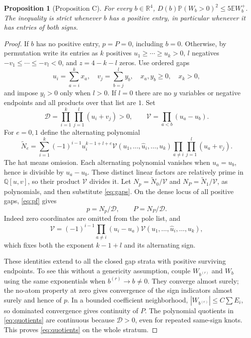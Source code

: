\documentclass[11pt]{article}
\newtheorem{proposition}[theorem]{Proposition}
\theoremstyle{remark}\newtheorem{remark}[theorem]{Remark}
\newcommand{\R}{\mathbb R}
\newcommand{\E}{\mathbb E}
\newcommand{\Prob}{\mathbb P}
\newcommand{\Den}{\mathcal D}
\newcommand{\Vand}{\mathcal V}
\numberwithin{equation}{section}
\begin{document}
\begin{proposition}[Proposition C]\label{prop:C}
For every $b\in\R^4$, $D(b)\Prob(W_b>0)^2\le5\E W_b^+$.
The inequality is strict whenever $b$ has a positive entry, in
particular whenever it has entries of both signs.
\end{proposition}
\begin{proof}
If $b$ has no positive entry, $p=P=0$, including $b=0$.
Otherwise, by permutation write its entries as $k$ positives
$u_1\ge\cdots\ge u_k>0$, $l$ negatives $-v_1\le\cdots\le-v_l<0$,
and $z=4-k-l$ zeros. Use ordered gaps
\begin{equation}\label{eq:gaps}
 u_i=\sum_{a=i}^k x_a,\quad v_j=\sum_{b=j}^l y_b,
 \quad x_a,y_b\ge0,\quad x_k>0,
\end{equation}
and impose $y_l>0$ only when $l>0$. If $l=0$ there are no $y$
variables or negative endpoints and all products over that list are $1$.
Set
\[
 \Den=\prod_{i=1}^k\prod_{j=1}^l(u_i+v_j)>0,\qquad
 \Vand=\prod_{a<b}(u_a-u_b).
\]
For $e=0,1$ define the alternating polynomial
\begin{equation}\label{eq:alternating}
 \widetilde N_e=\sum_{i=1}^k(-1)^{i-1}u_i^{k-1+l+e}
 \Vand(u_1,\ldots,\widehat u_i,\ldots,u_k)
 \prod_{a\ne i}\prod_{j=1}^l(u_a+v_j).
\end{equation}
The hat means omission. Each alternating polynomial vanishes when
$u_a=u_b$, hence is divisible by $u_a-u_b$. These distinct linear
factors are relatively prime in $\mathbb Q[u,v]$, so their product
$\Vand$ divides it. Let $N_p=\widetilde N_0/\Vand$ and
$N_P=\widetilde N_1/\Vand$, as polynomials, and then substitute
\eqref{eq:gaps}.
On the dense locus of all positive gaps, \eqref{eq:pf} gives
\begin{equation}\label{eq:quotients}
 p=N_p/\Den,\qquad P=N_P/\Den.
\end{equation}
Indeed zero coordinates are omitted from the pole list, and
\[
 \Vand=(-1)^{i-1}\prod_{a\ne i}(u_i-u_a)
 \Vand(u_1,\ldots,\widehat u_i,\ldots,u_k),
\]
which fixes both the exponent $k-1+l$ and its alternating sign.

These identities extend to all the closed gap strata with positive
surviving endpoints. To see this without a genericity assumption,
couple $W_{b^{(r)}}$ and $W_b$ using the same exponentials when
$b^{(r)}\to b\ne0$. They converge almost surely; the no-atom property
at zero gives convergence of the sign indicators almost surely and
hence of $p$. In a bounded coefficient neighborhood,
$|W_{b^{(r)}}|\le C\sum E_i$, so dominated convergence gives continuity
of $P$. The polynomial quotients in \eqref{eq:quotients} are continuous
because $\Den>0$, even for repeated same-sign knots. This proves
\eqref{eq:quotients} on the whole stratum.


\end{proof}
\end{document}
